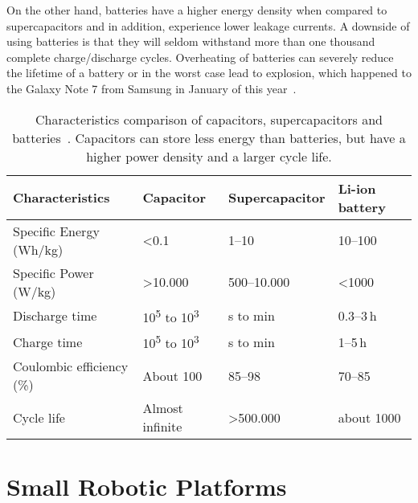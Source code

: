On the other hand, batteries have a higher energy density when compared to supercapacitors and in addition, experience lower leakage currents.
A downside of using batteries is that they will seldom withstand more than one thousand complete charge/discharge cycles.
Overheating of batteries can severely reduce the lifetime of a battery or in the worst case lead to explosion, which happened to the Galaxy Note 7 from Samsung in January of this year~\cite{samsung_note7_2017}.



\begin{table}[t]
	\centering
	\caption{Characteristics comparison of capacitors, supercapacitors and batteries~\cite{Gonzalez_rser_2016}. Capacitors can store less energy than batteries, but have a higher power density and a larger cycle life.}
	\label{tab:cap_scap_battery}
	\small
	\begin{tabular}{|l||l|l|l|}
		\hline
		Characteristics & Capacitor & Supercapacitor & Li-ion battery \\
		\hline \hline
		Specific Energy (Wh/kg) & \textless 0.1 & 1--10 & 10--100 \\
		Specific Power (W/kg) & \textgreater 10.000 & 500--10.000 & \textless 1000 \\
		Discharge time & 10\textsuperscript{5} to 10\textsuperscript{3} & s to min & 0.3--3\,h \\
		Charge time & 10\textsuperscript{5} to 10\textsuperscript{3} & s to min & 1--5\,h \\
		Coulombic efficiency (\%) & About 100 & 85--98 & 70--85 \\
		Cycle life & Almost infinite & \textgreater 500.000 & about 1000 \\
		\hline
	\end{tabular}
\end{table}


\section{Small Robotic Platforms}
\label{sec:rw_robotic_platforms}

